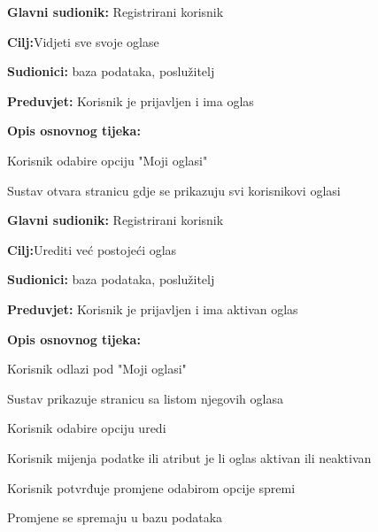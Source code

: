 \noindent {}
\begin{packed_item}
	
	\item \textbf{Glavni sudionik: }Registrirani korisnik
	\item  \textbf{Cilj:}Vidjeti sve svoje oglase
	\item  \textbf{Sudionici:} baza podataka, poslužitelj
	\item  \textbf{Preduvjet:} Korisnik je prijavljen i ima oglas
	\item  \textbf{Opis osnovnog tijeka:}
	
	\item[] \begin{packed_enum}
		
		\item Korisnik odabire opciju "Moji oglasi"
		\item Sustav otvara stranicu gdje se prikazuju svi korisnikovi oglasi
		
	\end{packed_enum}
\end{packed_item}

\noindent {}
\begin{packed_item}
	
	\item \textbf{Glavni sudionik: }Registrirani korisnik
	\item  \textbf{Cilj:}Urediti već postojeći oglas
	\item  \textbf{Sudionici:} baza podataka, poslužitelj
	\item  \textbf{Preduvjet:} Korisnik je prijavljen i ima aktivan oglas
	\item  \textbf{Opis osnovnog tijeka:}
	
	\item[] \begin{packed_enum}
		
		\item Korisnik odlazi pod "Moji oglasi" 
		\item Sustav prikazuje stranicu sa listom njegovih oglasa
		\item Korisnik odabire opciju uredi
		\item Korisnik mijenja podatke ili atribut je li oglas aktivan ili neaktivan
		\item Korisnik potvrđuje promjene odabirom opcije spremi
		\item Promjene se spremaju u bazu podataka 
		
	\end{packed_enum}
\end{packed_item}



